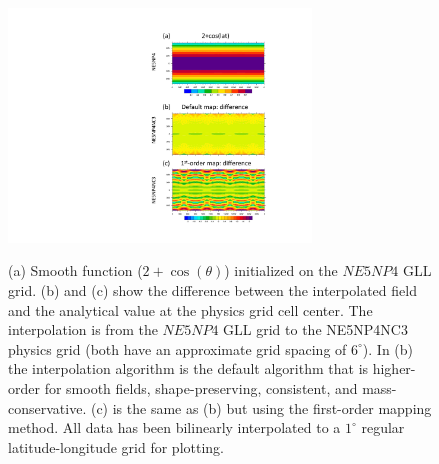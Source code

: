 \begin{figure}[t]
\noindent\includegraphics[width=19pc,angle=0]{figs/idealized-mapping-tests-smooth-field.pdf}\\
\caption{(a) Smooth function ($2+\cos(\theta)$) initialized on the $NE5NP4$ GLL grid. (b) and (c) show the difference between the interpolated field and the analytical value at the physics grid cell center. The interpolation is from the $NE5NP4$ GLL grid to the NE5NP4NC3 physics grid (both have an approximate grid spacing of $6^\circ$). In (b) the interpolation algorithm is the default algorithm that is higher-order for smooth fields, shape-preserving, consistent, and mass-conservative. (c) is the same as (b) but using the first-order mapping method. All data has been bilinearly interpolated to a $1^\circ$ regular latitude-longitude grid for plotting.}\label{fig:remap-smooth-field}
\end{figure}
